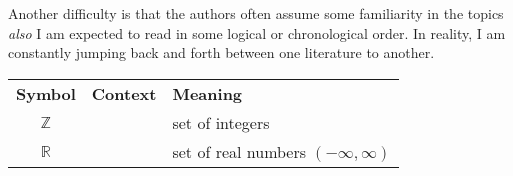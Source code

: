 Another difficulty is that  the authors often assume some familiarity in the topics
\textit{also} I am expected to read in some logical or chronological order.
In reality, I am constantly jumping back and forth between one literature to another.

\begin{table}[h!]
    \centering\renewcommand{\arraystretch}{1.2}
    \begin{tabular}{ccl}
        \textbf{Symbol} & \textbf{Context} & \textbf{Meaning}                       \\
        $\mathbb{Z}$    &                  & set of integers                        \\
        $\mathbb{R}$    &                  & set of real numbers $(-\infty,\infty)$ \\
    \end{tabular}
    \label{tab:real-notation}
\end{table}
\newpage